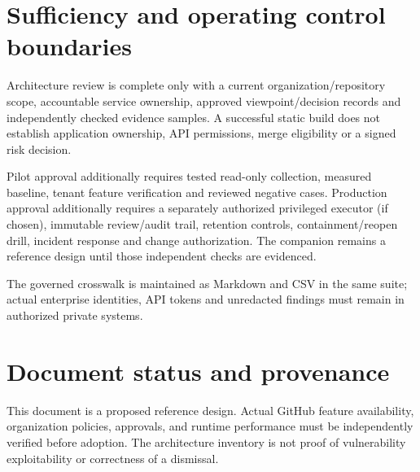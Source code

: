 \documentclass[11pt,letterpaper]{article}
\begin{document}
\section{Sufficiency and operating control boundaries}
Architecture review is complete only with a current organization/repository scope, accountable service ownership, approved viewpoint/decision records and independently checked evidence samples. A successful static build does not establish application ownership, API permissions, merge eligibility or a signed risk decision.

Pilot approval additionally requires tested read-only collection, measured baseline, tenant feature verification and reviewed negative cases. Production approval additionally requires a separately authorized privileged executor (if chosen), immutable review/audit trail, retention controls, containment/reopen drill, incident response and change authorization. The companion remains a reference design until those independent checks are evidenced.

The governed crosswalk is maintained as Markdown and CSV in the same suite; actual enterprise identities, API tokens and unredacted findings must remain in authorized private systems.

\section*{Document status and provenance}
This document is a proposed reference design. Actual GitHub feature availability, organization policies, approvals, and runtime performance must be independently verified before adoption. The architecture inventory is not proof of vulnerability exploitability or correctness of a dismissal.
\end{document}
